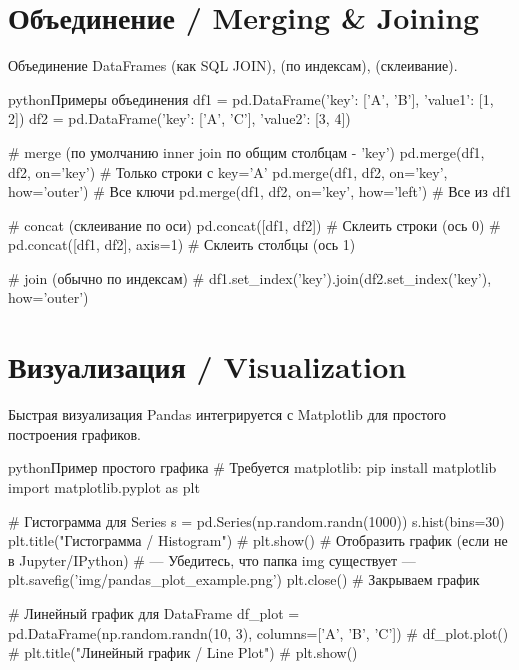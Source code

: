\section{Объединение / Merging \& Joining}
\begin{textbox}{Объединение DataFrames}
 (как SQL JOIN),  (по индексам),  (склеивание).

\begin{codebox}{python}{Примеры объединения}
df1 = pd.DataFrame({'key': ['A', 'B'], 'value1': [1, 2]})
df2 = pd.DataFrame({'key': ['A', 'C'], 'value2': [3, 4]})

# merge (по умолчанию inner join по общим столбцам - 'key')
pd.merge(df1, df2, on='key') # Только строки с key='A'
pd.merge(df1, df2, on='key', how='outer') # Все ключи
pd.merge(df1, df2, on='key', how='left') # Все из df1

# concat (склеивание по оси)
pd.concat([df1, df2]) # Склеить строки (ось 0)
# pd.concat([df1, df2], axis=1) # Склеить столбцы (ось 1)

# join (обычно по индексам)
# df1.set_index('key').join(df2.set_index('key'), how='outer')
\end{codebox}
\end{textbox}

\section{Визуализация / Visualization}
\begin{textbox}{Быстрая визуализация}
Pandas интегрируется с Matplotlib для простого построения графиков.

\begin{codebox}{python}{Пример простого графика}
# Требуется matplotlib: pip install matplotlib
import matplotlib.pyplot as plt

# Гистограмма для Series
s = pd.Series(np.random.randn(1000))
s.hist(bins=30)
plt.title("Гистограмма / Histogram")
# plt.show() # Отобразить график (если не в Jupyter/IPython)
# --- Убедитесь, что папка img существует ---
plt.savefig('img/pandas_plot_example.png')
plt.close() # Закрываем график

# Линейный график для DataFrame
df_plot = pd.DataFrame(np.random.randn(10, 3), columns=['A', 'B', 'C'])
# df_plot.plot()
# plt.title("Линейный график / Line Plot")
# plt.show()
\end{codebox}

\end{textbox}

